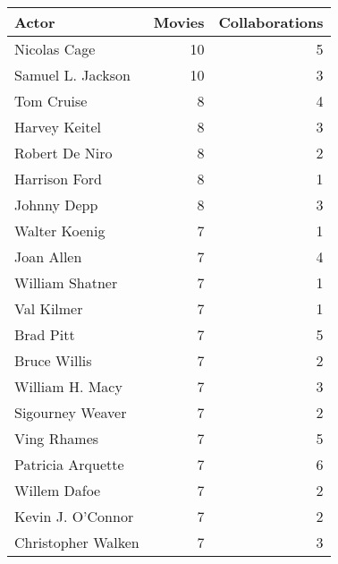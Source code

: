 \begin{tabular}{lrr}
\toprule
Actor & Movies & Collaborations \\
\midrule
Nicolas Cage & 10 & 5 \\
Samuel L. Jackson & 10 & 3 \\
Tom Cruise & 8 & 4 \\
Harvey Keitel & 8 & 3 \\
Robert De Niro & 8 & 2 \\
Harrison Ford & 8 & 1 \\
Johnny Depp & 8 & 3 \\
Walter Koenig & 7 & 1 \\
Joan Allen & 7 & 4 \\
William Shatner & 7 & 1 \\
Val Kilmer & 7 & 1 \\
Brad Pitt & 7 & 5 \\
Bruce Willis & 7 & 2 \\
William H. Macy & 7 & 3 \\
Sigourney Weaver & 7 & 2 \\
Ving Rhames & 7 & 5 \\
Patricia Arquette & 7 & 6 \\
Willem Dafoe & 7 & 2 \\
Kevin J. O'Connor & 7 & 2 \\
Christopher Walken & 7 & 3 \\
\bottomrule
\end{tabular}
